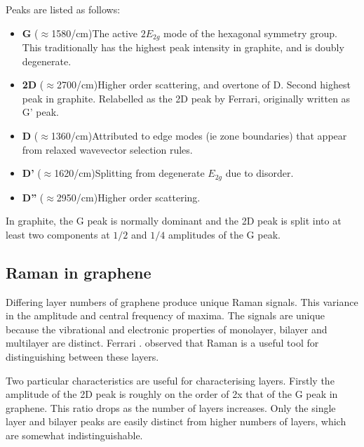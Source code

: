 \documentclass[../Matt_Gebert_Honours_Thesis.tex]{subfiles}
\begin{document}
Peaks are listed as follows:
\begin{itemize}[noitemsep,topsep=0pt,leftmargin=0.4cm]
	\item \textbf{G} ($\approx$1580/cm)\hspace{0.2cm}The active $2E_{2g}$ mode of the hexagonal symmetry group. This traditionally has the highest peak intensity in graphite, and is doubly degenerate.
	\item \textbf{2D} ($\approx$2700/cm)\hspace{0.2cm}Higher order scattering, and overtone of D. Second highest peak in graphite. Relabelled as the 2D peak by Ferrari, originally written as G' peak.
	\item \textbf{D} ($\approx$1360/cm)\hspace{0.2cm}Attributed to edge modes (ie zone boundaries) that appear from relaxed wavevector selection rules.
	\item \textbf{D'} ($\approx$1620/cm)\hspace{0.2cm}Splitting from degenerate $E_{2g}$ due to disorder.
	\item \textbf{D''} ($\approx$2950/cm)\hspace{0.2cm}Higher order scattering.	
\end{itemize}
In graphite, the G peak is normally dominant and the 2D peak is split into at least two components at $1/2$ and $1/4$ amplitudes of the G peak. 

\subsection{Raman in graphene}
Differing layer numbers of graphene produce unique Raman signals\cite{ferrari_raman_2006,ferrari_raman_2013}. This variance in the amplitude and central frequency of maxima. The signals are unique because the vibrational and electronic properties of monolayer, bilayer and multilayer are distinct. Ferrari \etal{}. observed that Raman is a useful tool for distinguishing between these layers.

Two particular characteristics are useful for characterising layers. Firstly the amplitude of the 2D peak is roughly on the order of 2x that of the G peak in graphene. This ratio drops as the number of layers increases. Only the single layer and bilayer peaks are easily distinct from higher numbers of layers, which are somewhat indistinguishable.
\end{document}
